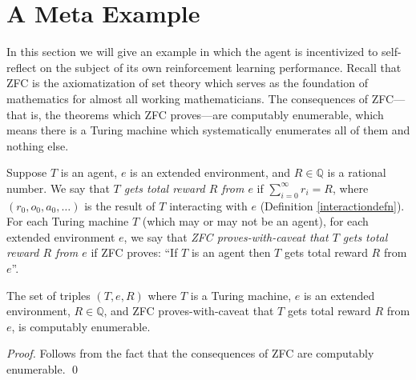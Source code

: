 \documentclass[runningheads]{llncs}
\begin{document}
\section{A Meta Example}

In this section we will give an example in which the agent is incentivized to self-reflect
on the subject of its own reinforcement learning performance.
Recall that ZFC is the axiomatization of set theory which serves as the
foundation of mathematics for almost all working mathematicians. The consequences of
ZFC---that is, the theorems which ZFC proves---are computably enumerable, which means
there is a Turing machine which systematically enumerates all of them and nothing else.

\begin{definition}
    Suppose $T$ is an agent, $e$ is an extended environment, and $R\in\mathbb Q$ is
    a rational number. We say that \emph{$T$ gets total reward $R$ from $e$} if
    $\sum_{i=0}^{\infty} r_i = R$, where $(r_0,o_0,a_0,\ldots)$ is the result of
    $T$ interacting with $e$ (Definition \ref{interactiondefn}).
    For each Turing machine $T$ (which may or may not be an agent),
    for each extended environment $e$,
    we say that \emph{ZFC proves-with-caveat that $T$ gets total reward $R$ from $e$}
    if ZFC proves: ``If $T$ is an agent then $T$ gets total reward $R$ from $e$''.
\end{definition}

\begin{lemma}
\label{provablerewardslemma}
    The set of triples $(T,e,R)$ where $T$ is a Turing machine, $e$ is an extended environment,
    $R\in\mathbb Q$, and
    ZFC proves-with-caveat that $T$ gets total reward $R$ from $e$,
    is computably enumerable.
\end{lemma}

\begin{proof}
    Follows from the fact that the consequences of ZFC are computably enumerable.
    \qed
\end{proof}
\end{document}
